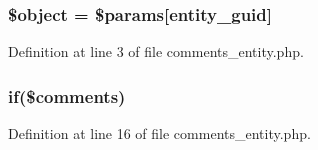 \subsubsection[{\texorpdfstring{\$object}{$object}}]{\setlength{\rightskip}{0pt plus 5cm}\$object = \$params\mbox{[}\textquotesingle{}entity\+\_\+guid\textquotesingle{}\mbox{]}}\hypertarget{comments__entity_8php_a52123b83a1952a68c5513e47d59ec4a6}{}\label{comments__entity_8php_a52123b83a1952a68c5513e47d59ec4a6}


Definition at line 3 of file comments\+\_\+entity.\+php.

\subsubsection[{\texorpdfstring{if}{if}}]{\setlength{\rightskip}{0pt plus 5cm}if(\$comments)}\hypertarget{comments__entity_8php_aaad1116b99ed75ccefcdb57f6ed3fb43}{}\label{comments__entity_8php_aaad1116b99ed75ccefcdb57f6ed3fb43}


Definition at line 16 of file comments\+\_\+entity.\+php.

